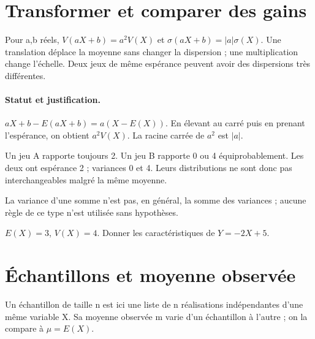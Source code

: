 \section{Transformer et comparer des gains}\label{C08-U4}
\begin{keypoint}
Pour a,b réels, $V(aX+b)=a^2V(X)$ et $\sigma(aX+b)=|a|\sigma(X)$. Une translation déplace la moyenne sans changer la dispersion ; une multiplication change l’échelle. Deux jeux de même espérance peuvent avoir des dispersions très différentes.
\end{keypoint}
\paragraph{Statut et justification.} $aX+b-E(aX+b)=a(X-E(X))$. En élevant au carré puis en prenant l’espérance, on obtient $a^2V(X)$. La racine carrée de $a^2$ est $|a|$.
\begin{example}Un jeu A rapporte toujours 2. Un jeu B rapporte 0 ou 4 équiprobablement. Les deux ont espérance 2 ; variances 0 et 4. Leurs distributions ne sont donc pas interchangeables malgré la même moyenne.\end{example}\label{C08-EX4}
\begin{pitfall}La variance d’une somme n’est pas, en général, la somme des variances ; aucune règle de ce type n’est utilisée sans hypothèses.\end{pitfall}
\begin{application}$E(X)=3$, $V(X)=4$. Donner les caractéristiques de $Y=-2X+5$.\end{application}\label{C08-AP4}
\section{Échantillons et moyenne observée}\label{C08-U5}
\begin{keypoint}
Un échantillon de taille n est ici une liste de n réalisations indépendantes d’une même variable X. Sa moyenne observée m varie d’un échantillon à l’autre ; on la compare à $\mu=E(X)$.
\end{keypoint}
